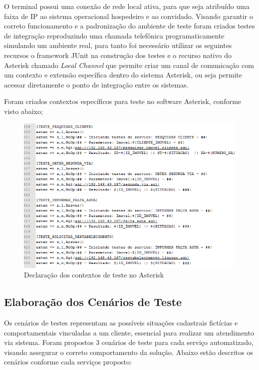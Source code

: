 O terminal possui uma conexão de rede local ativa, para que seja atribuído uma faixa de IP ao sistema operacional hospedeiro e ao convidado.
Visando garantir o correto funcionamento e a padronização do ambiente de teste foram criados testes de integração reproduzindo uma chamada telefônica programaticamente simulando um ambiente real, para tanto foi necessário utilizar os seguintes recursos o framework JUnit na construção dos testes e o recurso nativo do Asterisk chamado \textit{Local Channel} que permite criar um canal de comunicação com um contexto e extensão específica dentro do sistema Asterisk, ou seja permite acessar diretamente o ponto de integração entre os sistemas.

Foram criados contextos específicos para teste no software Asterisk, conforme visto abaixo;

\begin{figure}[H]
	\centering
	\caption{Declaração dos contextos de teste no Asterisk}
	\label{figura:contextoTeste}
	\includegraphics{figuras/contexto_teste.png}
\end{figure}



\subsection{Elaboração dos Cenários de Teste}

Os cenários de testes representam as possíveis situações cadastrais fictícias e comportamentais vinculadas a um cliente, essencial para realizar um atendimento via sistema. Foram propostos 3 cenários de teste para cada serviço automatizado, visando assegurar o correto comportamento da solução. Abaixo estão descritos os cenários conforme cada serviços proposto:

